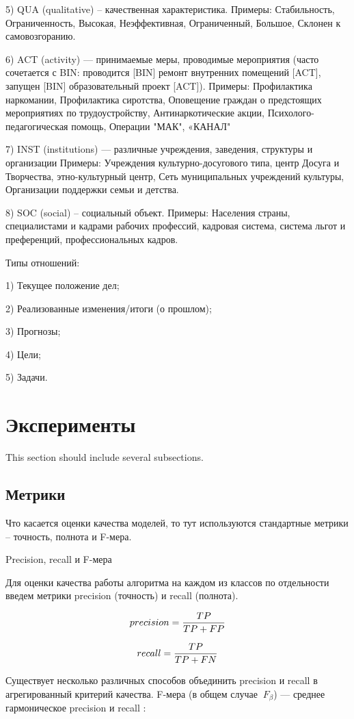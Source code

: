 \documentclass{article}
\begin{document}
5) QUA (qualitative) – качественная характеристика. 
Примеры: Стабильность, Ограниченность, Высокая, Неэффективная, Ограниченный, Большое, Склонен к самовозгоранию. 

6) ACT (activity) — принимаемые меры, проводимые мероприятия (часто сочетается с BIN: проводится [BIN] ремонт внутренних помещений [ACT], запущен [BIN] образовательный проект [ACT]). 
Примеры: Профилактика наркомании, Профилактика сиротства, Оповещение граждан о предстоящих мероприятиях по трудоустройству, Антинаркотические акции, Психолого-педагогическая помощь, Операции "МАК", «КАНАЛ" 

7) INST (institutions) — различные учреждения, заведения, структуры и организации 
Примеры: Учреждения культурно-досугового типа, центр Досуга и Творчества, этно-культурный центр, Сеть муниципальных учреждений культуры, Организации поддержки семьи и детства. 

8) SOC (social) – социальный объект. 
Примеры: Населения страны, специалистами и кадрами рабочих профессий, кадровая система, система льгот и преференций, профессиональных кадров.

Типы отношений: 

1) Текущее положение дел;

2) Реализованные изменения/итоги (о прошлом);

3) Прогнозы;

4) Цели;

5) Задачи.


\section{Эксперименты}
This section should include several subsections.
\subsection{Метрики}
Что касается оценки качества моделей, то тут используются стандартные метрики – точность, полнота и F-мера. 

Precision, recall и F-мера

Для оценки качества работы алгоритма на каждом из классов по отдельности введем метрики precision (точность) и recall (полнота).


$$\large precision = \frac{TP}{TP + FP}$$



$$\large recall = \frac{TP}{TP + FN}$$

Существует несколько различных способов объединить precision и recall в агрегированный критерий качества. F-мера (в общем случае $\ F_\beta$) — среднее гармоническое precision и recall :
\end{document}
